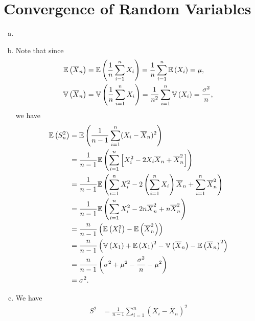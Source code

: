 \chapter{Convergence of Random Variables}

\begin{ex}
  \begin{enumerate}[(a)]
    \item[]
    \item Note that since
          \begin{align*}
            \mathbb{E}\left(\overline{X}_n\right)
             & =\mathbb{E}\left(\frac{1}{n}\sum_{i=1}^n X_i\right)
            =\frac{1}{n}\sum_{i=1}^n \mathbb{E}\left(X_i\right)
            =\mu,                                 \\
            \mathbb{V}\left(\overline{X}_n\right)
             & =\mathbb{V}\left(\frac{1}{n}\sum_{i=1}^n X_i\right)
            =\frac{1}{n^2}\sum_{i=1}^n \mathbb{V}\left(X_i\right)
            =\frac{\sigma^2}{n},
          \end{align*}
          we have
          \begin{align*}
            \mathbb{E}\left(S_n^2\right)
             & =\mathbb{E}\left(\frac{1}{n-1}\sum_{i=1}^n(X_i-\overline{X}_n)^2\right)                                                           \\
             & =\frac{1}{n-1}\mathbb{E}\left(\sum_{i=1}^n\left[X_i^2-2X_i\overline{X}_n+\overline{X}_n^2\right]\right)                           \\
             & =\frac{1}{n-1}\mathbb{E}\left(\sum_{i=1}^n X_i^2-2\left(\sum_{i=1}^n X_i\right)\overline{X}_n+\sum_{i=1}^n\overline{X}_n^2\right) \\
             & =\frac{1}{n-1}\mathbb{E}\left(\sum_{i=1}^nX_i^2-2n\overline{X}_n^2+n\overline{X}_n^2\right)                                       \\
             & = \frac{n}{n-1}\left(\mathbb{E}\left(X_1^2\right)-\mathbb{E}\left(\overline{X}_n^2\right)\right)                                                     \\
             & = \frac{n}{n-1}\left(\mathbb{V}\left(X_1\right)+\mathbb{E}\left(X_1\right)^2-\mathbb{V}\left(\overline{X}_n\right)-\mathbb{E}\left(\overline{X}_n\right)^2\right)                      \\
             & = \frac{n}{n-1}\left(\sigma^2+\mu^2-\frac{\sigma^2}{n}-\mu^2 \right)                                           \\
             & =\sigma^2.
          \end{align*}
    \item We have
          \begin{align*}
            S^2
             & =\frac{1}{n-1}\sum_{i=1}^n(X_i-\overline{X}_n)^2                                  \\

\end{align*}
\end{enumerate}
\end{ex}
